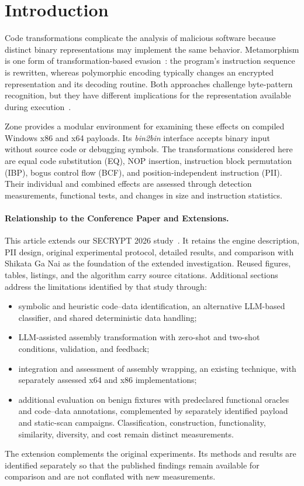 \documentclass[runningheads]{llncs}
\begin{document}
\section{Introduction}\label{sec:introduction}

Code transformations complicate the analysis of malicious software because distinct binary representations may implement the same behavior. Metamorphism is one form of transformation-based evasion~\cite{PEsurveybible}: the program's instruction sequence is rewritten, whereas polymorphic encoding typically changes an encrypted representation and its decoding routine. Both approaches challenge byte-pattern recognition, but they have different implications for the representation available during execution~\cite{metamorphic1,metamorphic2}.

Zone provides a modular environment for examining these effects on compiled Windows x86 and x64 payloads. Its \emph{bin2bin} interface accepts binary input without source code or debugging symbols. The transformations considered here are equal code substitution (EQ), NOP insertion, instruction block permutation (IBP), bogus control flow (BCF), and position-independent instruction (PII). Their individual and combined effects are assessed through detection measurements, functional tests, and changes in size and instruction statistics.

\paragraph{Relationship to the Conference Paper and Extensions.}
This article extends our SECRYPT 2026 study~\cite{zone_secrypt_2026}.
It retains the engine description, PII design, original experimental
protocol, detailed results, and comparison with Shikata Ga Nai as the
foundation of the extended investigation. Reused figures, tables,
listings, and the algorithm carry source citations. Additional sections
address the limitations identified by that study through:
\begin{itemize}
\item symbolic and heuristic code--data identification, an alternative
LLM-based classifier, and shared deterministic data handling;
\item LLM-assisted assembly transformation with zero-shot and two-shot
conditions, validation, and feedback;
\item integration and assessment of assembly wrapping, an existing
technique, with separately assessed x64 and x86 implementations;
\item additional evaluation on benign fixtures with predeclared
functional oracles and code--data annotations, complemented by
separately identified payload and static-scan campaigns. Classification,
construction, functionality, similarity, diversity, and cost remain
distinct measurements.
\end{itemize}
The extension complements the original experiments. Its methods and
results are identified separately so that the published findings remain
available for comparison and are not conflated with new measurements.
\end{document}
